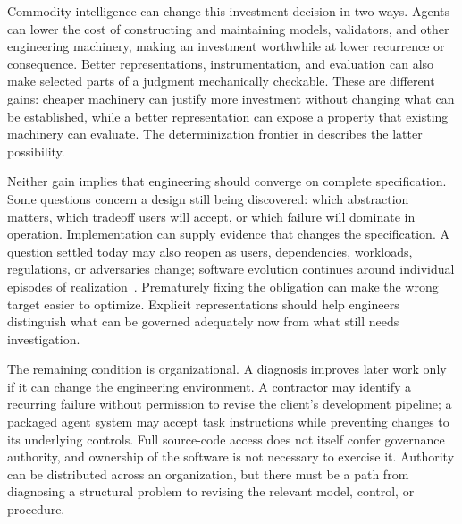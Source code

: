 
Commodity intelligence can change this investment decision in two ways. Agents can lower the cost of constructing and maintaining models, validators, and other engineering machinery, making an investment worthwhile at lower recurrence or consequence. Better representations, instrumentation, and evaluation can also make selected parts of a judgment mechanically checkable. These are different gains: cheaper machinery can justify more investment without changing what can be established, while a better representation can expose a property that existing machinery can evaluate. The determinization frontier in  describes the latter possibility.


Neither gain implies that engineering should converge on complete specification. Some questions concern a design still being discovered: which abstraction matters, which tradeoff users will accept, or which failure will dominate in operation. Implementation can supply evidence that changes the specification. A question settled today may also reopen as users, dependencies, workloads, regulations, or adversaries change; software evolution continues around individual episodes of realization~\citep{lehman2003evolution}. Prematurely fixing the obligation can make the wrong target easier to optimize. Explicit representations should help engineers distinguish what can be governed adequately now from what still needs investigation.


The remaining condition is organizational. A diagnosis improves later work only if it can change the engineering environment. A contractor may identify a recurring failure without permission to revise the client's development pipeline; a packaged agent system may accept task instructions while preventing changes to its underlying controls. Full source-code access does not itself confer governance authority, and ownership of the software is not necessary to exercise it. Authority can be distributed across an organization, but there must be a path from diagnosing a structural problem to revising the relevant model, control, or procedure.

